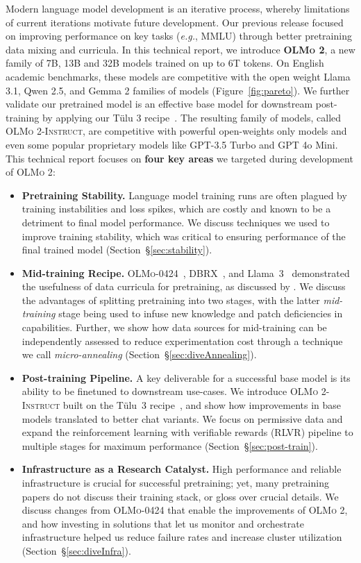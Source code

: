 \documentclass[table]{ai2style/ai2}
\newcommand{\olmoapril}{\textsc{OLMo-0424}\xspace}
\newcommand{\olmotoo}{\textsc{OLMo 2}\xspace}
\newcommand{\olmotooinstruct}{\textsc{OLMo 2-Instruct}\xspace}
\newcommand{\diveStability}{Pretraining Stability}
\newcommand{\diveAnnealing}{Mid-training Recipe}
\newcommand{\diveInfra}{Infrastructure as a Research Catalyst}
\newcommand{\divePost}{Post-training Pipeline}
\begin{document}
Modern language model development is an iterative process, whereby limitations of current iterations motivate future development.
Our previous release \citep[\olmoapril;][]{olmo_blog} focused on improving performance on key tasks (\textit{e.g.}, MMLU) through better pretraining data mixing and curricula.
In this technical report, we introduce \textbf{\olmotoo}, a new family of 7B, 13B and 32B models trained on up to 6T tokens. 
On English academic benchmarks, these models are competitive with the open weight Llama 3.1, Qwen 2.5, and Gemma 2 families of models (Figure~\ref{fig:pareto}).
We further validate our pretrained model is an effective base model for downstream post-training by applying our T\"ulu 3 recipe~\citep{lambert2024tulu3}.
The resulting family of models, called \olmotooinstruct, are competitive with powerful open-weights only models and even some popular proprietary models like GPT-3.5 Turbo and GPT 4o Mini.
This technical report focuses on \textbf{four key areas} we targeted during development of \olmotoo:
\begin{itemize}
    \item \textbf{\diveStability.} Language model training runs are often plagued by training instabilities and loss spikes, which are costly and known to be a detriment to final model performance. 
    We discuss techniques we used to improve training stability, which was critical to ensuring performance of the final trained model (Section~\S\ref{sec:stability}).
    \item \textbf{\diveAnnealing.} \olmoapril~\citep{olmo_blog}, DBRX~\citep{dbrx_blog}, and Llama~3~\citep{dubey2024llama} demonstrated the usefulness of data curricula for pretraining, as discussed by \citet{blakeney2024doesdatasparkjoy}.
    We discuss the advantages of splitting pretraining into two stages, with the latter \emph{mid-training} stage being used to infuse new knowledge and patch deficiencies in capabilities. 
    Further, we show how data sources for mid-training can be independently assessed to reduce experimentation cost through a technique we call \emph{micro-annealing} (Section~\S\ref{sec:diveAnnealing}). 
    \item \textbf{\divePost.} A key deliverable for a successful base model is its ability to be finetuned to downstream use-cases.  
    We introduce \olmotooinstruct built on the Tülu~3 recipe~\citep{lambert2024tulu3}, and show how improvements in base models translated to better chat variants. 
    We focus on permissive data and expand the reinforcement learning with verifiable rewards (RLVR) pipeline to multiple stages for maximum performance
    (Section~\S\ref{sec:post-train}).
    \item \textbf{\diveInfra.} 
    High performance and reliable infrastructure is crucial for successful pretraining;
    yet, many pretraining papers do not discuss their training stack, or gloss over crucial details.
    We discuss changes from \olmoapril that enable the improvements of \olmotoo, and how investing in solutions that let us monitor and orchestrate infrastructure helped us reduce failure rates and increase cluster utilization (Section~\S\ref{sec:diveInfra}).
         
\end{itemize}
\end{document}
